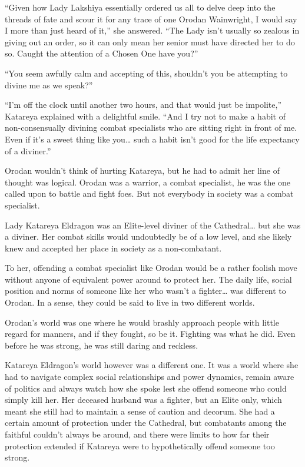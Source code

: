 \documentclass[a4paper,10pt]{book}
\begin{document}
“Given how Lady Lakshiya essentially ordered us all to delve deep into the threads of fate and scour it for any trace of one Orodan Wainwright, I would say I more than just heard of it,” she answered. “The Lady isn’t usually so zealous in giving out an order, so it can only mean her senior must have directed her to do so. Caught the attention of a Chosen One have you?”\par
“You seem awfully calm and accepting of this, shouldn’t you be attempting to divine me as we speak?”\par
“I’m off the clock until another two hours, and that would just be impolite,” Katareya explained with a delightful smile. “And I try not to make a habit of non-consensually divining combat specialists who are sitting right in front of me. Even if it’s a sweet thing like you… such a habit isn’t good for the life expectancy of a diviner.”\par
Orodan wouldn’t think of hurting Katareya, but he had to admit her line of thought was logical. Orodan was a warrior, a combat specialist, he was the one called upon to battle and fight foes. But not everybody in society was a combat specialist.\par
Lady Katareya Eldragon was an Elite-level diviner of the Cathedral… but she was a diviner. Her combat skills would undoubtedly be of a low level, and she likely knew and accepted her place in society as a non-combatant.\par
To her, offending a combat specialist like Orodan would be a rather foolish move without anyone of equivalent power around to protect her. The daily life, social position and norms of someone like her who wasn’t a fighter… was different to Orodan. In a sense, they could be said to live in two different worlds.\par
Orodan’s world was one where he would brashly approach people with little regard for manners, and if they fought, so be it. Fighting was what he did. Even before he was strong, he was still daring and reckless.\par
Katareya Eldragon’s world however was a different one. It was a world where she had to navigate complex social relationships and power dynamics, remain aware of politics and always watch how she spoke lest she offend someone who could simply kill her. Her deceased husband was a fighter, but an Elite only, which meant she still had to maintain a sense of caution and decorum. She had a certain amount of protection under the Cathedral, but combatants among the faithful couldn’t always be around, and there were limits to how far their protection extended if Katareya were to hypothetically offend someone too strong.\par
\end{document}
